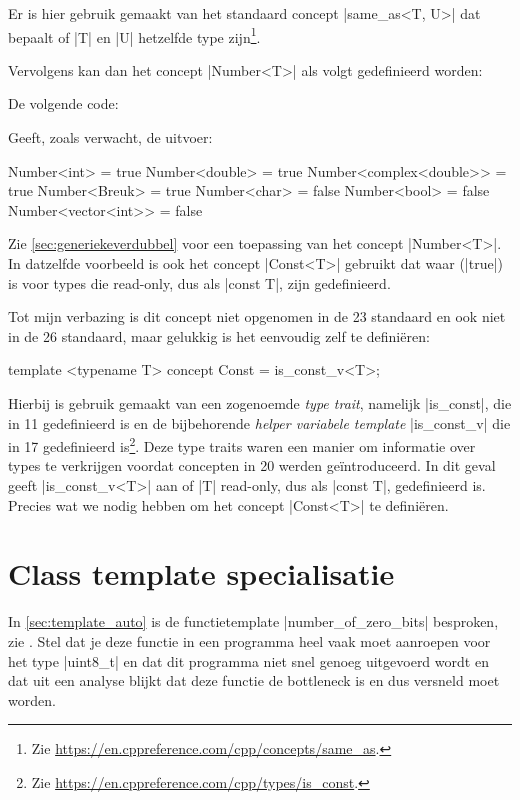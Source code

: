 \begin{cpplstShortInline}
Er is hier gebruik gemaakt van het standaard concept |same_as<T, U>| dat bepaalt of |T| en |U| hetzelfde type zijn\footnote{%
	Zie \url{https://en.cppreference.com/cpp/concepts/same_as}.
}.

Vervolgens kan dan het concept |Number<T>| als volgt gedefinieerd worden:

De volgende code:

Geeft, zoals verwacht, de uitvoer:
\begin{coutput}
Number<int> = true
Number<double> = true
Number<complex<double>> = true
Number<Breuk> = true
Number<char> = false
Number<bool> = false
Number<vector<int>> = false
\end{coutput}

Zie \cref{sec:generiekeverdubbel} voor een toepassing van het concept |Number<T>|.
In datzelfde voorbeeld is ook het concept |Const<T>| gebruikt dat waar (|true|) is voor types die read-only, dus als |const T|, zijn gedefinieerd.

Tot mijn verbazing is dit concept niet opgenomen in de \Cpp{}23 standaard en ook niet in de \Cpp{}26 standaard, maar gelukkig is het eenvoudig zelf te definiëren:
\begin{cpplstfragment}
template <typename T>
concept Const = is_const_v<T>;
\end{cpplstfragment}

Hierbij is gebruik gemaakt van een zogenoemde \emph{type trait}, namelijk |is_const|, die in \Cpp{}11 gedefinieerd is en de bijbehorende \emph{helper variabele template} |is_const_v| die in \Cpp{}17 gedefinieerd is\footnote{%
	Zie \url{https://en.cppreference.com/cpp/types/is_const}.
}.
Deze type traits waren een manier om informatie over types te verkrijgen voordat concepten in \Cpp{}20 werden geïntroduceerd.
In dit geval geeft |is_const_v<T>| aan of |T| read-only, dus als |const T|, gedefinieerd is.
Precies wat we nodig hebben om het concept |Const<T>| te definiëren.

\section{Class template specialisatie}
\label{sec:template_specialisatie}
In \cref{sec:template_auto} is de functietemplate |number_of_zero_bits| besproken, zie .
Stel dat je deze functie in een programma heel vaak moet aanroepen voor het type |uint8_t| en dat dit programma niet snel genoeg uitgevoerd wordt en dat uit een analyse blijkt dat deze functie de bottleneck is en dus versneld moet worden.


\end{cpplstShortInline}

